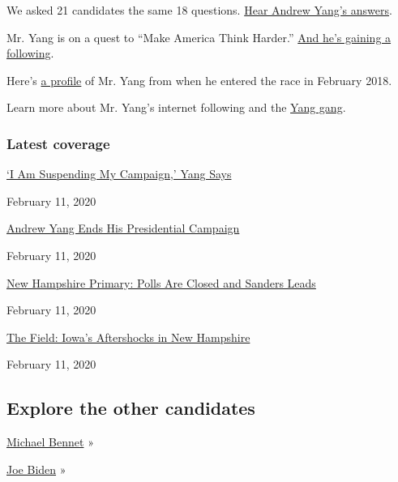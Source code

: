 We asked 21 candidates the same 18 questions.
\href{https://www.nytimes.com/interactive/2019/us/politics/andrew-yang-2020-campaign.html}{Hear
Andrew Yang's answers}.

Mr. Yang is on a quest to ``Make America Think Harder.''
\href{https://www.nytimes.com/2019/09/06/us/politics/andrew-yang-2020.html}{And
he's gaining a following}.

Here's
\href{https://www.nytimes.com/2018/02/10/technology/his-2020-campaign-message-the-robots-are-coming.html}{a
profile} of Mr. Yang from when he entered the race in February 2018.

Learn more about Mr. Yang's internet following and the
\href{https://www.nytimes.com/2019/03/20/technology/andrew-yang-internet-democratic-primary.html}{Yang
gang}.

\hypertarget{latest-coverage}{%
\subsubsection{Latest coverage}\label{latest-coverage}}

\href{https://www.nytimes.com/video/us/politics/100000006974917/andrew-yang-drops-out-2020.html}{`I
Am Suspending My Campaign,' Yang Says}

February 11, 2020

\href{https://www.nytimes.com/2020/02/11/us/politics/andrew-yang-drops-out.html}{Andrew
Yang Ends His Presidential Campaign}

February 11, 2020

\href{https://www.nytimes.com/2020/02/11/us/politics/nh-primary-election.html}{New
Hampshire Primary: Polls Are Closed and Sanders Leads}

February 11, 2020

\href{https://www.nytimes.com/2020/02/11/podcasts/the-daily/new-hampshire.html}{The
Field: Iowa's Aftershocks in New Hampshire}

February 11, 2020

\hypertarget{explore-the-other-candidates}{%
\subsection{Explore the other
candidates}\label{explore-the-other-candidates}}

\href{https://www.nytimes.com/interactive/2020/us/elections/michael-bennet.html}{Michael
Bennet} »

\href{https://www.nytimes.com/interactive/2020/us/elections/joe-biden.html}{Joe
Biden} »

